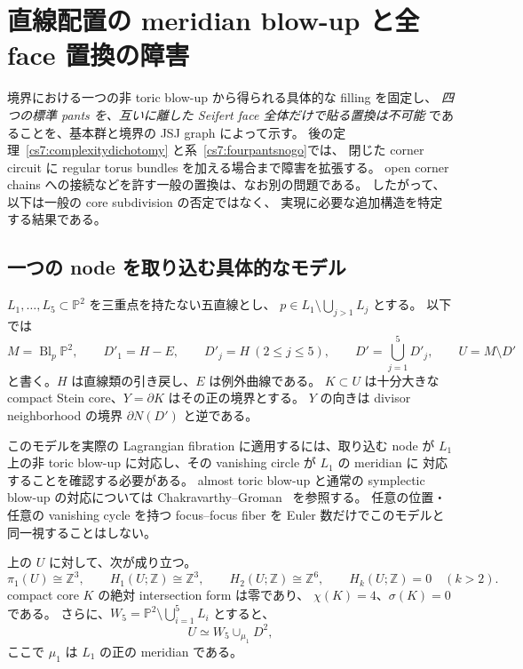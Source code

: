 \section{直線配置の meridian blow-up と全 face 置換の障害}
\label{cs6:section}

境界における一つの非 toric blow-up から得られる具体的な filling を固定し、
\emph{四つの標準 pants を、互いに離した Seifert face 全体だけで貼る置換は不可能}
であることを、基本群と境界の JSJ graph によって示す。
後の定理~\ref{cs7:complexitydichotomy} と系~\ref{cs7:fourpantsnogo}では、
閉じた corner circuit に regular torus bundles を加える場合まで障害を拡張する。
open corner chains への接続などを許す一般の置換は、なお別の問題である。
したがって、以下は一般の core subdivision の否定ではなく、
実現に必要な追加構造を特定する結果である。

\subsection{一つの node を取り込む具体的なモデル}

$L_1,\ldots,L_5\subset\mathbb P^2$ を三重点を持たない五直線とし、
$p\in L_1\setminus\bigcup_{j>1}L_j$ とする。
以下では
\[
 M=\operatorname{Bl}_p\mathbb P^2,\qquad
 D'_1=H-E,\qquad D'_j=H\ (2\leq j\leq5),\qquad
 D'=\bigcup_{j=1}^5D'_j,\qquad U=M\setminus D'
\]
と書く。$H$ は直線類の引き戻し、$E$ は例外曲線である。
$K\subset U$ は十分大きな compact Stein core、$Y=\partial K$ はその正の境界とする。
$Y$ の向きは divisor neighborhood の境界 $\partial N(D')$ と逆である。

このモデルを実際の Lagrangian fibration に適用するには、取り込む node が
$L_1$ 上の非 toric blow-up に対応し、その vanishing circle が $L_1$ の meridian に
対応することを確認する必要がある。
almost toric blow-up と通常の symplectic blow-up の対応については
Chakravarthy--Groman~\cite[Theorem~1.1, Lemma~3.7]{CGblowup} を参照する。
任意の位置・任意の vanishing cycle を持つ focus--focus fiber を
Euler 数だけでこのモデルと同一視することはしない。

\begin{proposition}
\label{cs6:invariants}
上の $U$ に対して、次が成り立つ。
\[
 \pi_1(U)\cong\mathbb Z^3,\qquad
 H_1(U;\mathbb Z)\cong\mathbb Z^3,\qquad
 H_2(U;\mathbb Z)\cong\mathbb Z^6,\qquad
 H_k(U;\mathbb Z)=0\quad(k>2).
\]
compact core $K$ の絶対 intersection form は零であり、
$\chi(K)=4$、$\sigma(K)=0$ である。
さらに、$W_5=\mathbb P^2\setminus\bigcup_{i=1}^5L_i$ とすると、
\begin{equation}
 U\simeq W_5\cup_{\mu_1}D^2,
 \label{cs6:cellattachment}
\end{equation}
ここで $\mu_1$ は $L_1$ の正の meridian である。
\end{proposition}

